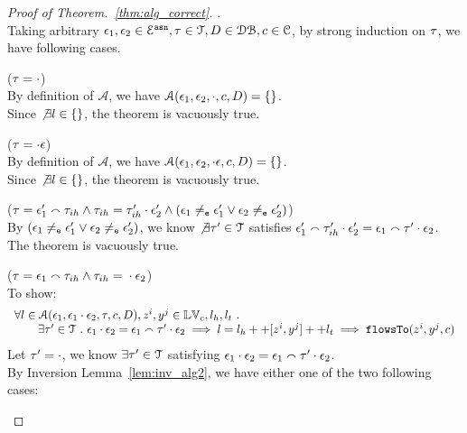 \documentclass[a4paper,11pt]{article}
\begin{document}
\begin{proof}[Proof of Theorem.~\ref{thm:alg_correct}].
\\
Taking arbitrary $\mathtt{\epsilon}_1, \mathtt{\epsilon}_2 \in \mathcal{E}^{\mathtt{{asn}}}, \mathtt{\tau} \in \mathcal{T}, D \in \mathcal{DB} , c \in \mathcal{C}$,
by strong induction on $\mathtt{\tau}$, we have following cases.
\begin{case}($\mathtt{\tau} = \cdot$)
\\
By definition of $\mathcal{A}$, we have
$\mathcal{A}(\mathtt{\epsilon}_1, \mathtt{\epsilon}_2, \cdot, c, D) = \{\}$.
\\
Since $\not\exists l \in \{\}$, the theorem is vacuously true.
\end{case}
%
\begin{case}($\mathtt{\tau} = \cdot \mathtt{\epsilon}$)
\\
By definition of $\mathcal{A}$, we have
$\mathcal{A}(\mathtt{\epsilon}_1, \mathtt{\epsilon}_2, \cdot \mathtt{\epsilon}, c, D) = \{\}$.
\\
Since $\not\exists l \in \{\}$, the theorem is vacuously true.
\end{case}
%
\begin{case}($\mathtt{\tau} = \mathtt{\epsilon}_1' \smallfrown \mathtt{\tau}_{ih} \land \mathtt{\tau}_{ih} = \mathtt{\tau}_{ih}' \cdot \mathtt{\epsilon}_2' \land 
(\mathtt{\epsilon}_1 \neq_{\mathtt{e}} \mathtt{\epsilon}_1' \lor \mathtt{\epsilon}_2 \neq_{\mathtt{e}} \mathtt{\epsilon}_2')$)
\\
By $(\mathtt{\epsilon}_1 \neq_{\mathtt{e}} \mathtt{\epsilon}_1' \lor \mathtt{\epsilon}_2 \neq_{\mathtt{e}} \mathtt{\epsilon}_2')$,
we know $\not\exists \mathtt{\tau}' \in \mathcal{T}$ satisfies $
\mathtt{\epsilon}_1' \smallfrown \mathtt{\tau}_{ih}' \cdot \mathtt{\epsilon}_2' = \mathtt{\epsilon}_1 \smallfrown \mathtt{\tau}' \cdot \mathtt{\epsilon}_2$.
\\
The theorem is vacuously true.
\end{case}
%
%
\begin{case}
\label{case:alg_correct_base}
($\mathtt{\tau} = \mathtt{\epsilon}_1 \smallfrown \mathtt{\tau}_{ih} \land \mathtt{\tau}_{ih} = {} \cdot {} \mathtt{\epsilon}_2$)
\\
To show:
\[
\begin{array}{l}
   \forall l \in \mathcal{A}(\mathtt{\epsilon}_1, \mathtt{\epsilon}_1  {} \cdot {} \mathtt{\epsilon}_2, \mathtt{\tau}, c, D), z^i, y^j \in \mathbb{LV}_c, l_h, l_t ~.~ 
  \\ \qquad 
   \exists \mathtt{\tau}' \in \mathcal{T} ~.~ 
   \mathtt{\epsilon}_1  {} \cdot {} \mathtt{\epsilon}_2 = \mathtt{\epsilon}_1 \smallfrown \mathtt{\tau}' \cdot \mathtt{\epsilon}_2
   \implies 
   l = l_h ++ [z^i, y^j] ++ l_t 
   \implies \mathtt{flowsTo}(z^i, y^j, c)
\end{array}
\]
%
Let $\mathtt{\tau}' = \cdot$, we know $\exists \mathtt{\tau}' \in \mathcal{T}$ satisfying 
$\mathtt{\epsilon}_1  {} \cdot {} \mathtt{\epsilon}_2 = \mathtt{\epsilon}_1 \smallfrown \mathtt{\tau}' \cdot \mathtt{\epsilon}_2$.
\\
By Inversion Lemma~\ref{lem:inv_alg2}, we have either one of the two following cases:

\end{case}
\end{proof}
\end{document}
